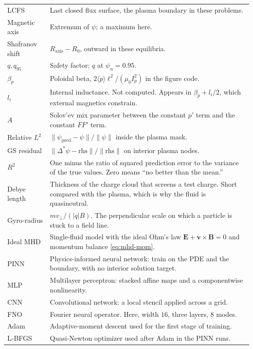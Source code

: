 \documentclass[11pt,a4paper,oneside,openany]{book}
\numberwithin{equation}{chapter}
\newcommand{\Dstar}{\Delta^{*}}
\newcommand{\psin}{\psi_{n}}
\newcommand{\Ip}{I_{p}}
\theoremstyle{definition}
\begin{document}
\begin{longtable}{@{}>{\raggedright\arraybackslash}p{} >{\raggedright\arraybackslash}p{}@{}}
LCFS & Last closed flux surface, the plasma boundary in these problems. \\
Magnetic axis & Extremum of \(\psi\); a maximum here. \\
Shafranov shift & \(R_{\mathrm{axis}}-R_{0}\), outward in these equilibria. \\
\(q,q_{95}\) & Safety factor; \(q\) at \(\psin=0.95\). \\
\(\beta_{p}\) & Poloidal beta, \(2\langle p\rangle\ell^{2}/(\mu_{0}\Ip^{2})\) in the figure code. \\
\(l_{i}\) & Internal inductance. Not computed. Appears in \(\beta_{p}+l_{i}/2\), which external magnetics constrain. \\
\(A\) & Solov'ev mix parameter between the constant \(p'\) term and the constant \(FF'\) term. \\
Relative \(L^{2}\) & \(\lVert\psi_{\mathrm{pred}}-\psi\rVert/\lVert\psi\rVert\) inside the plasma mask. \\
GS residual & \(\lVert\Dstar\psi-\mathrm{rhs}\rVert/\lVert\mathrm{rhs}\rVert\) on interior plasma nodes. \\
\(R^{2}\) & One minus the ratio of squared prediction error to the variance of the true values. Zero means ``no better than the mean.'' \\
Debye length & Thickness of the charge cloud that screens a test charge. Short compared with the plasma, which is why the fluid is quasineutral. \\
Gyro-radius & \(m v_{\perp}/(\lvert q\rvert B)\). The perpendicular scale on which a particle is stuck to a field line. \\
Ideal MHD & Single-fluid model with the ideal Ohm's law \(\mathbf{E}+\mathbf{v}\times\mathbf{B}=0\) and momentum balance \eqref{eq:mhd-mom}. \\
PINN & Physics-informed neural network: train on the PDE and the boundary, with no interior solution target. \\
MLP & Multilayer perceptron: stacked affine maps and a componentwise nonlinearity. \\
CNN & Convolutional network: a local stencil applied across a grid. \\
FNO & Fourier neural operator. Here, width \(16\), three layers, \(8\) modes. \\
Adam & Adaptive-moment descent used for the first stage of training. \\
L-BFGS & Quasi-Newton optimizer used after Adam in the PINN runs. \\

\end{longtable}
\end{document}
